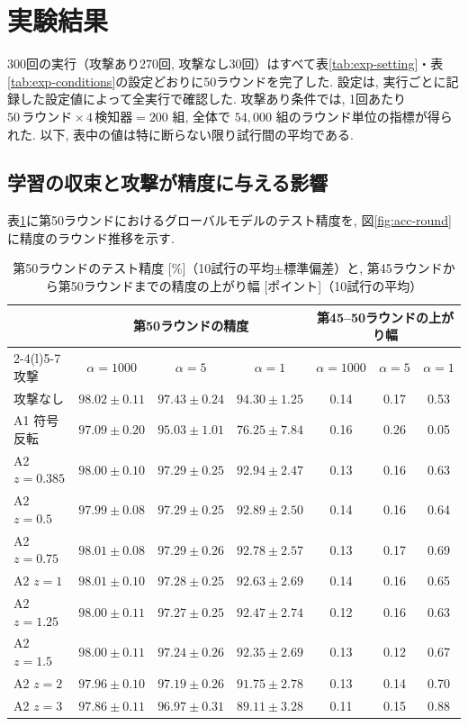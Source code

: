 \documentclass[a4j, twocolumn, dvipdfmx]{jsarticle}
\begin{document}
\section{実験結果}
\label{sec:results}

300回の実行（攻撃あり270回, 攻撃なし30回）はすべて表\ref{tab:exp-setting}・表\ref{tab:exp-conditions}の設定どおりに50ラウンドを完了した. 設定は, 実行ごとに記録した設定値によって全実行で確認した. 攻撃あり条件では, 1回あたり $50\,\text{ラウンド} \times 4\,\text{検知器} = 200$ 組, 全体で $54{,}000$ 組のラウンド単位の指標が得られた. 以下, 表中の値は特に断らない限り試行間の平均である.

\subsection{学習の収束と攻撃が精度に与える影響}
\label{sec:res-acc}

表\ref{tab:acc}に第50ラウンドにおけるグローバルモデルのテスト精度を, 図\ref{fig:acc-round}に精度のラウンド推移を示す.

\begin{table}[t]
\centering
\caption{第50ラウンドのテスト精度 [\%]（10試行の平均$\pm$標準偏差）と, 第45ラウンドから第50ラウンドまでの精度の上がり幅 [ポイント]（10試行の平均）}
\label{tab:acc}
\small
\begin{tabular}{@{}lcccccc@{}}
\toprule
 & \multicolumn{3}{c}{第50ラウンドの精度} & \multicolumn{3}{c}{第45--50ラウンドの上がり幅} \\
\cmidrule(lr){2-4}\cmidrule(l){5-7}
攻撃 & $\alpha=1000$ & $\alpha=5$ & $\alpha=1$ & $\alpha=1000$ & $\alpha=5$ & $\alpha=1$ \\
\midrule
攻撃なし & $98.02 \pm 0.11$ & $97.43 \pm 0.24$ & $94.30 \pm 1.25$ & 0.14 & 0.17 & 0.53 \\
A1 符号反転 & $97.09 \pm 0.20$ & $95.03 \pm 1.01$ & $76.25 \pm 7.84$ & 0.16 & 0.26 & 0.05 \\
\midrule
A2 $z{=}0.385$ & $98.00 \pm 0.10$ & $97.29 \pm 0.25$ & $92.94 \pm 2.47$ & 0.13 & 0.16 & 0.63 \\
A2 $z{=}0.5$ & $97.99 \pm 0.08$ & $97.29 \pm 0.25$ & $92.89 \pm 2.50$ & 0.14 & 0.16 & 0.64 \\
A2 $z{=}0.75$ & $98.01 \pm 0.08$ & $97.29 \pm 0.26$ & $92.78 \pm 2.57$ & 0.13 & 0.17 & 0.69 \\
A2 $z{=}1$ & $98.01 \pm 0.10$ & $97.28 \pm 0.25$ & $92.63 \pm 2.69$ & 0.14 & 0.16 & 0.65 \\
A2 $z{=}1.25$ & $98.00 \pm 0.11$ & $97.27 \pm 0.25$ & $92.47 \pm 2.74$ & 0.12 & 0.16 & 0.63 \\
A2 $z{=}1.5$ & $98.00 \pm 0.11$ & $97.24 \pm 0.26$ & $92.35 \pm 2.69$ & 0.13 & 0.12 & 0.67 \\
A2 $z{=}2$ & $97.96 \pm 0.10$ & $97.19 \pm 0.26$ & $91.75 \pm 2.78$ & 0.13 & 0.14 & 0.70 \\
A2 $z{=}3$ & $97.86 \pm 0.11$ & $96.97 \pm 0.31$ & $89.11 \pm 3.28$ & 0.11 & 0.15 & 0.88 \\
\bottomrule
\end{tabular}
\end{table}
\end{document}
